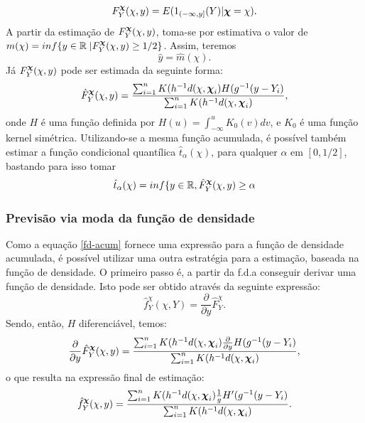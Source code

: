 \documentclass[
	12pt,				%
	openright,			%
	oneside,			%
	a4paper,			%
	english,			%
	brazil				%
	]{dissertacao-ufrgs-abntex2}
\begin{document}
\begin{equation} \label{fd-acum}
F_{Y}^{\boldsymbol{\chi}}(\chi,y)=E(1_{(-\infty,y]}(Y)|\boldsymbol{\chi}=\chi).
\end{equation}
A partir da estimação de $F_{Y}^{\boldsymbol{\chi}}(\chi,y)$, toma-se por estimativa
o valor de $m(\chi)=inf\{y\in\mathbb{R\mid}F_{Y}^{\boldsymbol{\chi}}(\chi,y)\geq1/2\}$.
Assim, teremos 
\[
\hat{y}=\hat{m}(\chi).
\]
Já $F_{Y}^{\boldsymbol{\chi}}(\chi,y)$ pode ser estimada da seguinte forma:
\begin{equation}
\hat{F}_{Y}^{\boldsymbol{\chi}}(\chi,y)=\frac{\sum_{i=1}^{n}K(h^{-1}d(\chi,\boldsymbol{\chi}_{i})H(g^{-1}(y-Y_{i})}{\sum_{i=1}^{n}K(h^{-1}d(\chi,\boldsymbol{\chi}_{i})},
\end{equation}
onde $H$ é uma função definida por $H(u)=\int_{-\infty}^{u}K_{0}(v)dv$,
e $K_{0}$ é uma função kernel simétrica.
Utilizando-se a mesma função acumulada, é possível também estimar a função condicional quantílica $\hat{t}_{\alpha}(\chi)$, para qualquer $\alpha$ em $[0,1/2]$, bastando para isso tomar
\begin{equation}
\hat{t}_{\alpha}(\chi)=inf\{y\in\mathbb{R},\hat{F}_{Y}^{\boldsymbol{\chi}}(\chi,y)\geq\alpha
\end{equation}


\subsubsection*{Previsão via moda da função de densidade}

Como a equação \ref{fd-acum} fornece uma expressão para a função de densidade acumulada, é possível utilizar uma outra estratégia para a estimação, baseada na função de densidade. O primeiro passo é, a partir da f.d.a conseguir derivar uma função de densidade. Isto pode ser obtido através da seguinte expressão:
\begin{equation}
\hat{f}_Y^\chi(\chi,Y)=\frac{\partial}{\partial y} \hat{F}_Y^\chi.
\end{equation}
Sendo, então, $H$ diferenciável, temos:
\begin{equation}
\frac{\partial}{\partial y} \hat{F}_{Y}^{\boldsymbol{\chi}}(\chi,y) = \frac{\sum_{i=1}^{n}K(h^{-1}d(\chi,\boldsymbol{\chi}_{i}) \frac{\partial}{\partial y} H(g^{-1}(y-Y_{i})}{\sum_{i=1}^{n}K(h^{-1}d(\chi,\boldsymbol{\chi}_{i})},
\end{equation}
o que resulta na expressão final de estimação:
\begin{equation}
\hat{f}_{Y}^{\boldsymbol{\chi}}(\chi,y) = \frac{\sum_{i=1}^{n}K(h^{-1}d(\chi,\boldsymbol{\chi}_{i}) \frac{1}{g} H'(g^{-1}(y-Y_{i})}{\sum_{i=1}^{n}K(h^{-1}d(\chi,\boldsymbol{\chi}_{i})}.
\end{equation}
\end{document}
